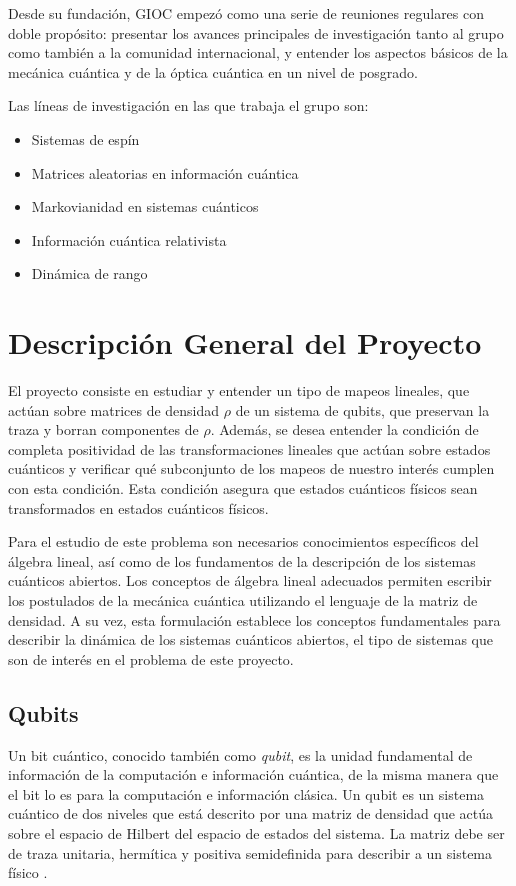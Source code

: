 \documentclass[11pt, spanish, letterpage]{article} %
\newcounter{problem}[section]
\begin{document}
Desde su fundación, GIOC empezó como una serie de reuniones regulares con doble
propósito: presentar los avances principales de investigación tanto al grupo
como también a la comunidad internacional, y entender los aspectos básicos de
la mecánica cuántica y de la óptica cuántica en un nivel de posgrado. 

Las líneas de investigación en las que trabaja el grupo son:
\begin{itemize}
	\item Sistemas de espín
	\item Matrices aleatorias en información cuántica
	\item Markovianidad en sistemas cuánticos
	\item Información cuántica relativista
	\item Dinámica de rango
\end{itemize}

\newpage
\section{Descripción General del Proyecto}  %
El proyecto consiste en estudiar y entender un tipo de mapeos lineales, que actúan
sobre matrices de densidad $\rho$ de un sistema de qubits, que preservan la traza y
borran componentes de $\rho$. Además, se desea entender la condición de completa
positividad de las transformaciones lineales que actúan sobre estados cuánticos y 
verificar qué subconjunto de los mapeos de nuestro interés cumplen con esta condición.
Esta condición asegura que estados cuánticos físicos sean transformados en estados 
cuánticos físicos. 

Para el estudio de este problema son necesarios conocimientos específicos del
álgebra lineal, así como de los fundamentos de la descripción de los sistemas
cuánticos abiertos. Los conceptos de álgebra lineal adecuados permiten
escribir los postulados de la mecánica cuántica utilizando el lenguaje de la
matriz de densidad. A su vez, esta formulación establece los conceptos
fundamentales para describir la dinámica de los sistemas cuánticos abiertos, el
tipo de sistemas que son de interés en el problema de este proyecto.

\subsection{Qubits} %
Un bit cuántico, conocido también como \textit{qubit}, es la unidad fundamental
de información de la computación e información cuántica, de la misma manera que
el bit lo es para la computación e información clásica. Un qubit es un sistema
cuántico de dos niveles que está descrito por una matriz de densidad que
actúa sobre el espacio de Hilbert del espacio de estados del
sistema. La matriz debe ser de traza unitaria, hermítica y positiva
semidefinida para describir a un sistema físico \cite{nielsen_chuang_2011}. 
\end{document}
